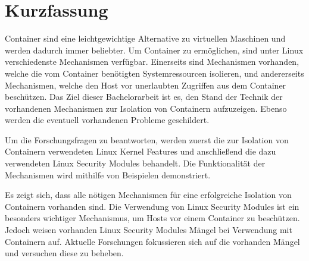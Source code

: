 \chapter{Kurzfassung}

Container sind eine leichtgewichtige Alternative zu virtuellen Maschinen und
werden dadurch immer beliebter. Um Container zu ermöglichen, sind unter Linux
verschiedenste Mechanismen verfügbar. Einerseits sind Mechanismen vorhanden,
welche die vom Container benötigten Systemressourcen isolieren, und
andererseits Mechanismen, welche den Host vor unerlaubten Zugriffen aus dem Container
beschützen. Das Ziel dieser Bachelorarbeit ist es, den Stand der Technik der
vorhandenen Mechanismen zur Isolation von Containern aufzuzeigen. Ebenso werden
die eventuell vorhandenen Probleme geschildert.

Um die Forschungsfragen zu beantworten, werden zuerst die zur Isolation von
Containern verwendeten Linux Kernel Features und anschließend die dazu
verwendeten Linux Security Modules behandelt. Die Funktionalität der
Mechanismen wird mithilfe von Beispielen demonstriert.

Es zeigt sich, dass alle nötigen Mechanismen für eine erfolgreiche Isolation
von Containern vorhanden sind. Die Verwendung von Linux Security Modules ist
ein besonders wichtiger Mechanismus, um Hosts vor einem Container zu
beschützen. Jedoch weisen vorhanden Linux Security Modules Mängel bei
Verwendung mit Containern auf. Aktuelle Forschungen fokussieren sich auf die
vorhanden Mängel und versuchen diese zu beheben.
